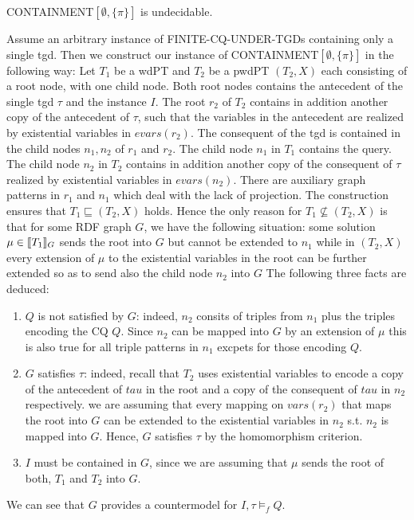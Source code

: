 \begin{theorem}\label{cemptypi}
	CONTAINMENT$[\emptyset,\{\pi\}]$ is undecidable.
\end{theorem}
\begin{proofidea}
	Assume an arbitrary instance of FINITE-CQ-UNDER-TGDs containing only a
	single tgd. Then we construct our instance of
	CONTAINMENT$[\emptyset,\{\pi\}]$ in the following way:
	Let $T_1$ be a wdPT and $T_2$ be a pwdPT $(T_2,X)$ each consisting of a root
	node, with one child node. Both root nodes contains the antecedent of the
	single tgd $\tau$ and the instance $I$.
	The root $r_2$ of $T_2$ contains in addition another copy of the antecedent
	of $\tau$, such that the variables in the antecedent are realized by
	existential variables in $evars(r_2)$.
	The consequent of the tgd is contained in the child nodes $n_1,n_2$ of $r_1$ and
	$r_2$. The child node $n_1$ in $T_1$ contains the query. The child node
	$n_2$ in $T_2$ contains in addition another copy of the consequent of $\tau$
	realized by existential variables in $evars(n_2)$.
	There are auxiliary graph patterns in $r_1$ and $n_1$ which deal with the
	lack of projection. 
	The construction ensures that $T_1 \sqsubseteq(T_2,X)$ holds. 
	Hence the only reason for $T_1 \not\subseteq (T_2,X)$ is that for some RDF
	graph $G$, we have the following situation: some solution $\mu \in \llbracket
	T_1\rrbracket_G$ sends the root into $G$ but cannot be extended to $n_1$ while in
	$(T_2,X)$ every extension of $\mu$ to the existential variables in the root
	can be further extended so as to send also the child node $n_2$ into $G$
	The following three facts are deduced:
	\begin{enumerate}
		\item $Q$ is not satisfied by $G$: indeed, $n_2$ consits of triples from
			$n_1$ plus the triples encoding the CQ $Q$. Since $n_2$ can be
			mapped into $G$ by an extension of $\mu$ this is also true for all
			triple patterns in $n_1$ excpets for those encoding $Q$.
		\item $G$ satisfies $\tau$: indeed, recall that $T_2$ uses existential
			variables to encode a copy of the antecedent of $tau$ in the root
			and a copy of the consequent of $tau$ in $n_2$ respectively. we are
			assuming that every mapping on $vars(r_2)$ that maps the root into
			$G$ can be extended to the existential variables in $n_2$ s.t. $n_2$
			is mapped into $G$. Hence, $G$ satisfies $\tau$ by the homomorphism
			criterion.
		\item $I$ must be contained in $G$, since we are assuming that $\mu$
			sends the root of both, $T_1$ and $T_2$ into $G$.
	\end{enumerate}
	We can see that $G$ provides a countermodel for $I,\tau \models_f Q$.
\end{proofidea}

